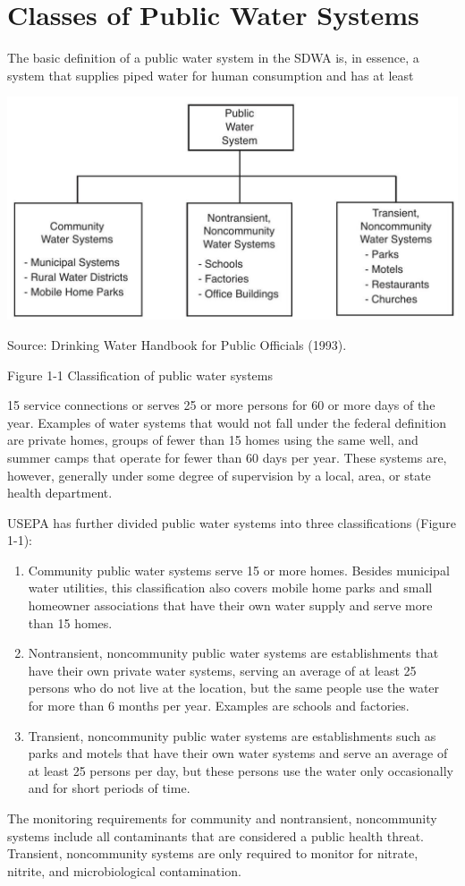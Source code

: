 \documentclass[10pt]{article}
\begin{document}
\section{Classes of Public Water Systems}
The basic definition of a public water system in the SDWA is, in essence, a system that supplies piped water for human consumption and has at least

\includegraphics[max width=\textwidth]{2022_09_17_867b38c7c364bb842283g-03}

Source: Drinking Water Handbook for Public Officials (1993).

Figure 1-1 Classification of public water systems

15 service connections or serves 25 or more persons for 60 or more days of the year. Examples of water systems that would not fall under the federal definition are private homes, groups of fewer than 15 homes using the same well, and summer camps that operate for fewer than 60 days per year. These systems are, however, generally under some degree of supervision by a local, area, or state health department.

USEPA has further divided public water systems into three classifications (Figure 1-1):

\begin{enumerate}
  \item Community public water systems serve 15 or more homes. Besides municipal water utilities, this classification also covers mobile home parks and small homeowner associations that have their own water supply and serve more than 15 homes.

  \item Nontransient, noncommunity public water systems are establishments that have their own private water systems, serving an average of at least 25 persons who do not live at the location, but the same people use the water for more than 6 months per year. Examples are schools and factories.

  \item Transient, noncommunity public water systems are establishments such as parks and motels that have their own water systems and serve an average of at least 25 persons per day, but these persons use the water only occasionally and for short periods of time.

\end{enumerate}
The monitoring requirements for community and nontransient, noncommunity systems include all contaminants that are considered a public health threat. Transient, noncommunity systems are only required to monitor for nitrate, nitrite, and microbiological contamination.
\end{document}
